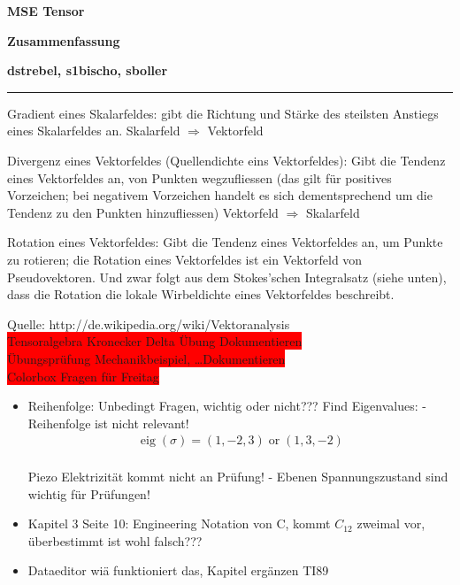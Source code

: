 \documentclass[a4paper]{scrartcl}
\begin{document}
\pagestyle{fancy}
\fancyhf{} 
\fancyfoot[C]{\thepage} %
\renewcommand{\headrulewidth}{0pt}
\renewcommand{\footrulewidth}{0.5pt}

 \centerline{\LARGE \bf \textsf{MSE Tensor}} 
 \smallskip
\centerline{\Large \bf \textsf {Zusammenfassung}}
\medskip
  \centerline{\bf \textsf{dstrebel, s1bischo, sboller }}

 \smallskip \noindent\rule{\textwidth}{0.5pt}
\smallskip%




Gradient eines Skalarfeldes: gibt die Richtung und Stärke des steilsten Anstiegs
eines Skalarfeldes an.
Skalarfeld $\Rightarrow$ Vektorfeld

Divergenz eines Vektorfeldes (Quellendichte eins Vektorfeldes): Gibt die Tendenz
eines Vektorfeldes an, von Punkten wegzufliessen (das gilt für positives
Vorzeichen; bei negativem Vorzeichen handelt es sich dementsprechend um die
Tendenz zu den Punkten hinzufliessen) Vektorfeld $\Rightarrow$ Skalarfeld

Rotation eines Vektorfeldes: Gibt die Tendenz eines Vektorfeldes an, um Punkte
zu rotieren; die Rotation eines Vektorfeldes ist ein Vektorfeld von
Pseudovektoren. Und zwar folgt aus dem Stokes’schen Integralsatz (siehe unten),
dass die Rotation die lokale Wirbeldichte eines Vektorfeldes beschreibt.

Quelle: http://de.wikipedia.org/wiki/Vektoranalysis\\

\colorbox{red}{Tensoralgebra Kronecker Delta Übung Dokumentieren}\\
\colorbox{red}{Übungsprüfung Mechanikbeispiel, \ldots Dokumentieren}\\
\colorbox{red}{Colorbox Fragen für Freitag}\\
\begin{itemize}
	\item Reihenfolge: Unbedingt Fragen, wichtig oder nicht???
Find Eigenvalues: - Reihenfolge ist nicht relevant!
\begin{align}
\operatorname{eig}(\sigma)=\left(1,-2, 3\right) \operatorname{or}
\left(1,3,-2\right)
\end{align}\\

Piezo Elektrizität kommt nicht an Prüfung!
- Ebenen Spannungszustand sind wichtig für Prüfungen!

	\item Kapitel 3 Seite 10: Engineering Notation von C, kommt $C_12$ zweimal vor,
	überbestimmt ist wohl falsch???
	\item Dataeditor wiä funktioniert das, Kapitel ergänzen TI89

\end{itemize}
\end{document}
